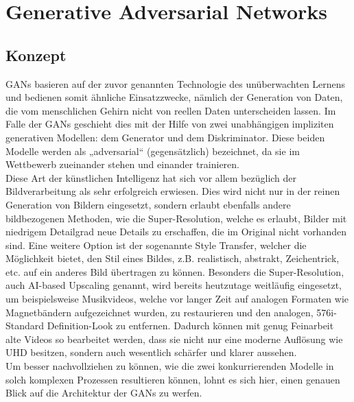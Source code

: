 \chapter{Generative Adversarial Networks}

\section{Konzept}

\noindent \acfp{GAN} basieren auf der zuvor genannten Technologie des unüberwachten Lernens und bedienen somit ähnliche Einsatzzwecke, nämlich der Generation von Daten, die vom menschlichen Gehirn nicht von reellen Daten unterscheiden lassen. Im Falle der \acp{GAN} geschieht dies mit der Hilfe von zwei unabhängigen impliziten generativen Modellen: dem Generator und dem Diskriminator. Diese beiden Modelle werden als „adversarial“ (gegensätzlich) bezeichnet, da sie im Wettbewerb zueinander stehen und einander trainieren.  \\

\noindent Diese Art der künstlichen Intelligenz hat sich vor allem bezüglich der Bildverarbeitung als sehr erfolgreich erwiesen. Dies wird nicht nur in der reinen Generation von Bildern eingesetzt, sondern erlaubt ebenfalls andere bildbezogenen Methoden, wie die Super-Resolution, welche es erlaubt, Bilder mit niedrigem Detailgrad neue Details zu erschaffen, die im Original nicht vorhanden sind. Eine weitere Option ist der sogenannte Style Transfer, welcher die Möglichkeit bietet, den Stil eines Bildes, z.B. realistisch, abstrakt, Zeichentrick, etc. auf ein anderes Bild übertragen zu können. Besonders die Super-Resolution, auch AI-based Upscaling genannt, wird bereits heutzutage weitläufig eingesetzt, um beispielsweise Musikvideos, welche vor langer Zeit auf analogen Formaten wie Magnetbändern aufgezeichnet wurden, zu restaurieren und den analogen, 576i-Standard Definition-Look zu entfernen. Dadurch können mit genug Feinarbeit alte Videos so bearbeitet werden, dass sie nicht nur eine moderne Auflösung wie UHD besitzen, sondern auch wesentlich schärfer und klarer aussehen. \\

\noindent Um besser nachvollziehen zu können, wie die zwei konkurrierenden Modelle in solch komplexen Prozessen resultieren können, lohnt es sich hier, einen genauen Blick auf die Architektur der \acp{GAN} zu werfen.

\newpage